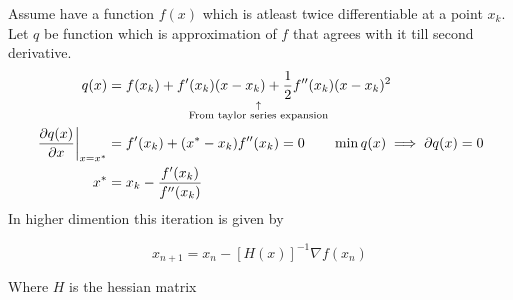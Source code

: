 \begin{slide}
	Assume have a function $f(x)$ which is atleast twice differentiable at a point $x_k$. Let $q$ be function which is approximation of $f$ that agrees with it till second derivative.
	\begin{align*}
	q(x) &= \explain{f(x_k) + f'(x_k)(x-x_k) + {1\over 2} f''(x_k)(x-x_k)^2}{\text{From taylor series expansion}}
	\\
	\left.{\partial q(x) \over \partial x}\right|_{x=x^*} &= f'(x_k) + (x^*-x_k)f''(x_k) = 0
	\qquad\min q(x) \implies \partial q(x) = 0
	\\
	x^* &= x_k-{f'(x_k)\over f''(x_k)}
	\end{align*}
	In higher dimention this iteration is given by
	\begin{shaded}
	$$x_{n+1} = x_n - [H(x)]^{-1}\nabla f(x_n)$$
	\end{shaded}
	Where $H$ is the hessian matrix
\end{slide}
